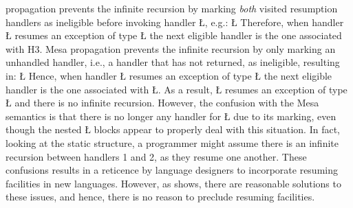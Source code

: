 \documentclass[openright,twoside]{report}
\begin{document}
\uC propagation prevents the infinite recursion by marking \emph{both} visited resumption handlers as ineligible before invoking handler \LGinlinetrue\LGbegin\lgrinde\L{}\endlgrinde\LGend{}, e.g.:
\LGinlinefalse\LGbegin\lgrinde
\L{}
\endlgrinde\LGend
Therefore, when handler \LGinlinetrue\LGbegin\lgrinde\L{}\endlgrinde\LGend{} resumes an exception of type \LGinlinetrue\LGbegin\lgrinde\L{}\endlgrinde\LGend{} the next eligible handler is the one associated with H3.
Mesa propagation prevents the infinite recursion by only marking an unhandled handler, i.e., a handler that has not returned, as ineligible, resulting in:
\LGinlinefalse\LGbegin\lgrinde
\L{}
\endlgrinde\LGend
Hence, when handler \LGinlinetrue\LGbegin\lgrinde\L{}\endlgrinde\LGend{} resumes an exception of type \LGinlinetrue\LGbegin\lgrinde\L{}\endlgrinde\LGend{} the next eligible handler is the one associated with \LGinlinetrue\LGbegin\lgrinde\L{}\endlgrinde\LGend{}.
As a result, \LGinlinetrue\LGbegin\lgrinde\L{}\endlgrinde\LGend{} resumes an exception of type \LGinlinetrue\LGbegin\lgrinde\L{}\endlgrinde\LGend{} and there is no infinite recursion.
However, the confusion with the Mesa semantics is that there is no longer any handler for \LGinlinetrue\LGbegin\lgrinde\L{}\endlgrinde\LGend{} due to its marking, even though the nested \LGinlinetrue\LGbegin\lgrinde\L{}\endlgrinde\LGend{} blocks appear to properly deal with this situation.
In fact, looking at the static structure, a programmer might assume there is an infinite recursion between handlers 1 and 2, as they resume one another.
These confusions results in a reticence by language designers to incorporate resuming facilities in new languages.
However, as \uC shows, there are reasonable solutions to these issues, and hence, there is no reason to preclude resuming facilities.
\end{document}
